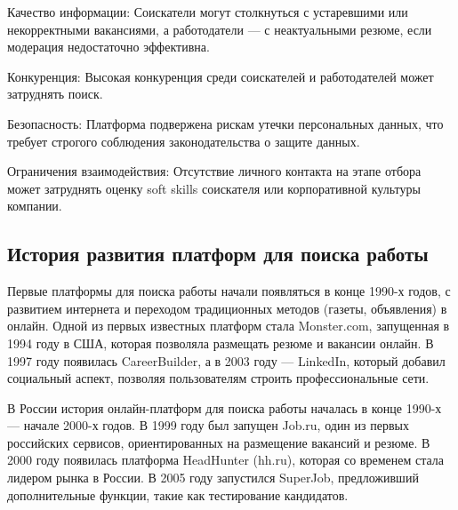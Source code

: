 Качество информации: Соискатели могут столкнуться с устаревшими или некорректными вакансиями, а работодатели — с неактуальными резюме, если модерация недостаточно эффективна.

Конкуренция: Высокая конкуренция среди соискателей и работодателей может затруднять поиск.

Безопасность: Платформа подвержена рискам утечки персональных данных, что требует строгого соблюдения законодательства о защите данных.

Ограничения взаимодействия: Отсутствие личного контакта на этапе отбора может затруднять оценку soft skills соискателя или корпоративной культуры компании.

\subsection{История развития платформ для поиска работы}

Первые платформы для поиска работы начали появляться в конце 1990-х годов, с развитием интернета и переходом традиционных методов (газеты, объявления) в онлайн. Одной из первых известных платформ стала Monster.com, запущенная в 1994 году в США, которая позволяла размещать резюме и вакансии онлайн. В 1997 году появилась CareerBuilder, а в 2003 году — LinkedIn, который добавил социальный аспект, позволяя пользователям строить профессиональные сети.

В России история онлайн-платформ для поиска работы началась в конце 1990-х — начале 2000-х годов. В 1999 году был запущен Job.ru, один из первых российских сервисов, ориентированных на размещение вакансий и резюме. В 2000 году появилась платформа HeadHunter (hh.ru), которая со временем стала лидером рынка в России. В 2005 году запустился SuperJob, предложивший дополнительные функции, такие как тестирование кандидатов.
